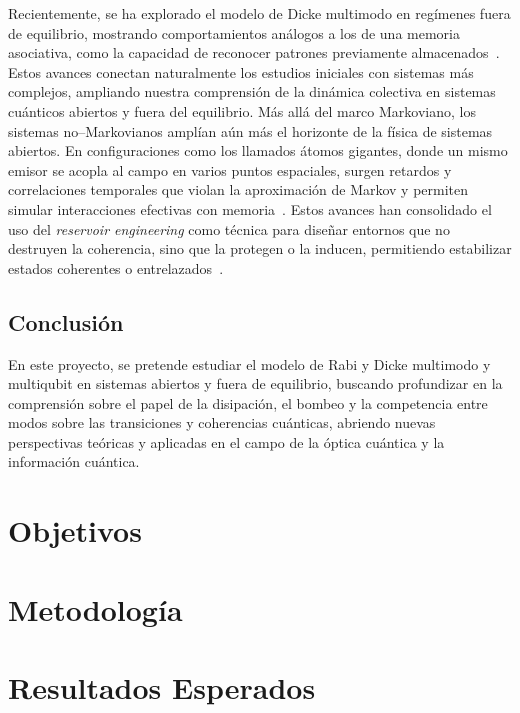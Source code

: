 \documentclass[onecolumn,notitlepage,letterpaper,aps,pra,12pt]{article}
\numberwithin{equation}{section}
\begin{document}
Recientemente, se ha explorado el modelo de Dicke multimodo en regímenes fuera de equilibrio, mostrando comportamientos análogos a los de una memoria asociativa, como la capacidad de reconocer patrones previamente almacenados~\cite{fiorelli2020}. Estos avances conectan naturalmente los estudios iniciales con sistemas más complejos, ampliando nuestra comprensión de la dinámica colectiva en sistemas cuánticos abiertos y fuera del equilibrio.
Más allá del marco Markoviano, los sistemas no–Markovianos amplían aún más el horizonte de la física de sistemas abiertos. En configuraciones como los llamados átomos gigantes, donde un mismo emisor se acopla al campo en varios puntos espaciales, surgen retardos y correlaciones temporales que violan la aproximación de Markov y permiten simular interacciones efectivas con memoria~\cite{kockum2019,guo2020}. Estos avances han consolidado el uso del \textit{reservoir engineering} como técnica para diseñar entornos que no destruyen la coherencia, sino que la protegen o la inducen, permitiendo estabilizar estados coherentes o entrelazados~\cite{poyatos1996,Diehl2008}.



\subsection{Conclusión}

En este proyecto, se pretende estudiar el modelo de Rabi y Dicke  multimodo y multiqubit en sistemas abiertos y fuera de equilibrio, buscando profundizar en la comprensión sobre el papel de la disipación, el bombeo y la competencia entre modos sobre las transiciones y coherencias cuánticas, abriendo nuevas perspectivas teóricas y aplicadas en el campo de la óptica cuántica y la información cuántica. 




\section{Objetivos}

\section{Metodología}

\section{Resultados Esperados}
\end{document}
